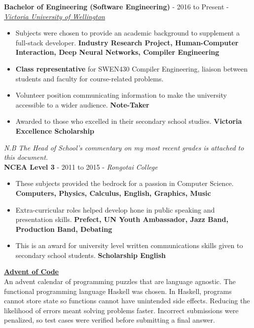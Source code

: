 \documentclass[9pt]{developercv}
\begin{document}

\textbf{Bachelor of Engineering (Software Engineering)} - 2016 to Present - \emph{\href{https://www.wgtn.ac.nz/}{Victoria University of Wellington}}
\begin{itemize}
    \item Subjects were chosen to provide an academic background to supplement a full-stack developer. \textbf{Industry Research Project, Human-Computer Interaction, Deep Neural Networks, Compiler Engineering}
    \item \textbf{Class representative} for SWEN430 Compiler Engineering, liaison between students and faculty for course-related problems. 
    \item Volunteer position communicating information to make the university accessible to a wider audience. \textbf{Note-Taker}
    \item Awarded to those who excelled in their secondary school studies. \textbf{Victoria Excellence Scholarship}
\end{itemize}
\emph{N.B The Head of School's commentary on my most recent grades is attached to this document.} \\

\textbf{NCEA Level 3} - 2011 to 2015 - \emph{Rongotai College}
\begin{itemize}
    \item These subjects provided the bedrock for a passion in Computer Science. \textbf{Computers, Physics, Calculus, English, Graphics, Music}
    \item Extra-curricular roles helped develop hone in public speaking and presentation skills. \textbf{Prefect, UN Youth Ambassador, Jazz Band, Production Band, Debating}
    \item This is an award for university level written communications skills given to secondary school students. \textbf{Scholarship English}
\end{itemize}



\textbf{\href{https://github.com/woodRock/verbose-computing-machine}{Advent of Code}} \\
An advent calendar of programming puzzles that are language agnostic. The functional programming language Haskell was chosen. In Haskell, programs cannot store state so functions cannot have unintended side effects. Reducing the likelihood of errors meant solving problems faster. Incorrect submissions were penalized, so test cases were verified before submitting a final answer. \\
\end{document}
